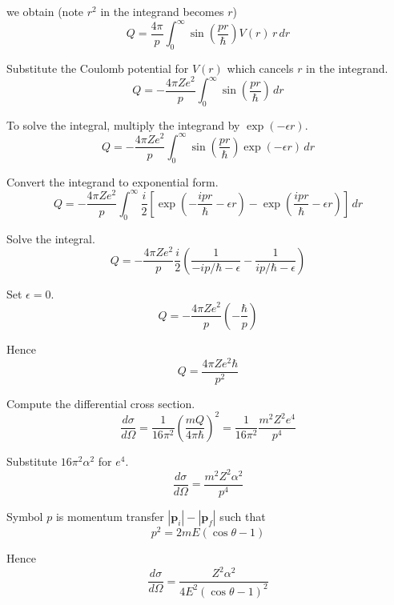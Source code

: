 we obtain (note $r^2$ in the integrand becomes $r$)
\begin{equation*}
Q=\frac{4\pi}{p}
\int_0^\infty\sin\left(\frac{pr}{\hbar}\right)V(r)\,r\,dr
\end{equation*}

Substitute the Coulomb potential for $V(r)$ which cancels $r$ in the integrand.
\begin{equation*}
Q=-\frac{4\pi Ze^2}{p}
\int_0^\infty\sin\left(\frac{pr}{\hbar}\right)\,dr
\end{equation*}

To solve the integral, multiply the integrand by $\exp(-\epsilon r)$.
\begin{equation*}
Q=-\frac{4\pi Ze^2}{p}
\int_0^\infty\sin\left(\frac{pr}{\hbar}\right)\exp(-\epsilon r)\,dr
\end{equation*}

Convert the integrand to exponential form.
\begin{equation*}
Q=-\frac{4\pi Ze^2}{p}
\int_0^\infty\frac{i}{2}\left[
\exp\left(-\frac{ipr}{\hbar}-\epsilon r\right)
-\exp\left(\frac{ipr}{\hbar}-\epsilon r\right)
\right]\,dr
\end{equation*}

Solve the integral.
\begin{equation*}
Q=-\frac{4\pi Ze^2}{p}\frac{i}{2}
\left(\frac{1}{-ip/\hbar-\epsilon}-\frac{1}{ip/\hbar-\epsilon}\right)
\tag{1}
\end{equation*}

Set $\epsilon=0$.
\begin{equation*}
Q=-\frac{4\pi Ze^2}{p}\left(-\frac{\hbar}{p}\right)
\end{equation*}

Hence
\begin{equation*}
Q=\frac{4\pi Ze^2\hbar}{p^2}
\end{equation*}

Compute the differential cross section.
\begin{equation*}
\frac{d\sigma}{d\Omega}=\frac{1}{16\pi^2}\left(\frac{mQ}{4\pi\hbar}\right)^2
=\frac{1}{16\pi^2}\frac{m^2Z^2e^4}{p^4}
\tag{2}
\end{equation*}

Substitute $16\pi^2\alpha^2$ for $e^4$.
\begin{equation*}
\frac{d\sigma}{d\Omega}=\frac{m^2Z^2\alpha^2}{p^4}
\end{equation*}

Symbol $p$ is momentum transfer $|\mathbf p_i|-|\mathbf p_f|$ such that
\begin{equation*}
p^2=2mE(\cos\theta-1)
\end{equation*}

Hence
\begin{equation*}
\frac{d\sigma}{d\Omega}=\frac{Z^2\alpha^2}{4E^2(\cos\theta-1)^2}
\tag{3}
\end{equation*}


